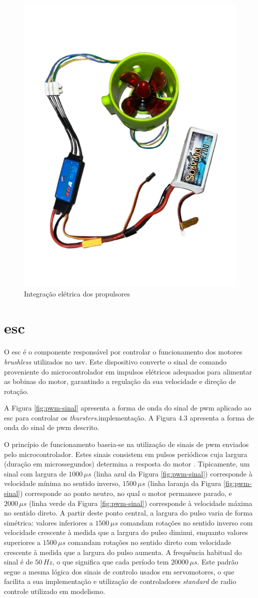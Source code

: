 \begin{figure}[H]
    \centering
    \includegraphics[width=0.5\linewidth, angle=-90]{figuras/IMG_4420-removebg-preview.png}
    \caption{Integração elétrica dos propulsores}
    \label{fig:bat-thruster}
\end{figure}

\section{\acrfull{esc}}
\label{sec:esc}

O \acrfull{esc} é o componente responsável por controlar o funcionamento dos motores \emph{brushless} utilizados no \gls{usv}. Este dispositivo converte o sinal de comando proveniente do microcontrolador em impulsos elétricos adequados para alimentar as bobinas do motor, garantindo a regulação da sua velocidade e direção de rotação.

A Figura \ref{fig:pwm-sinal} apresenta a forma de onda do sinal de \gls{pwm} aplicado ao \gls{esc} para controlar os \emph{thursters}.implementação. A Figura 4.3 apresenta a forma de onda do sinal de \gls{pwm} descrito.

O princípio de funcionamento baseia-se na utilização de sinais de \gls{pwm} enviados pelo microcontrolador. Estes sinais consistem em pulsos periódicos cuja largura (duração em microssegundos) determina a resposta do motor \cite{didactic-robot-thesis}. Tipicamente, um sinal com largura de $1000\,\mu s$ (linha azul da Figura \ref{fig:pwm-sinal}) corresponde à velocidade mínima no sentido inverso, $1500\,\mu s$ (linha laranja da Figura \ref{fig:pwm-sinal}) corresponde ao ponto neutro, no qual o motor permanece parado, e $2000\,\mu s$ (linha verde da Figura \ref{fig:pwm-sinal}) corresponde à velocidade máxima no sentido direto. A partir deste ponto central, a largura do pulso varia de forma simétrica: valores inferiores a $1500\,\mu s$ comandam rotações no sentido inverso com velocidade crescente à medida que a largura do pulso diminui, enquanto valores superiores a $1500\,\mu s$ comandam rotações no sentido direto com velocidade crescente à medida que a largura do pulso aumenta. A frequência habitual do sinal é de $50\,Hz$, o que significa que cada período tem $20000\,\mu s$. Este padrão segue a mesma lógica dos sinais de controlo usados em servomotores, o que facilita a sua implementação e utilização de controladores \emph{standard} de radio controle utilizado em modelismo. 

